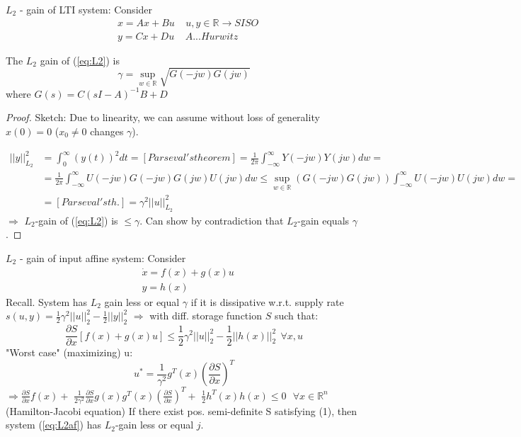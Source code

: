 $L_2$ - gain of LTI system:
 Consider 
 \begin{equation} \label{eq:L2}
\begin{split}
&x=Ax+Bu \ \ \ \ \ u,y\in\mathbb{R}\rightarrow SISO\\
&y=Cx+Du \ \ \ \ \ A ... Hurwitz
\end{split}
\end{equation}
 \begin{Lemma}
The $L_2$ gain of (\ref{eq:L2}) is
$$\gamma=\sup_{w\in\mathbb{R}}\sqrt{G(-jw)G(jw)}$$
 where $G(s)=C(sI-A)^{-1}B+D$
\begin{proof}
 Sketch:
  Due to linearity, we can assume without loss of generality $x(0)=0$ ($x_0 \ne 0$ changes $\gamma$).
  
 \begin{equation*}
  \begin{split}
   ||y||^2_{L_2} &=\int_0^\infty (y(t))^2dt = [Parseval's theorem]=\frac{1}{2\pi}\int_{-\infty}^\infty Y(-jw)Y(jw)dw=\\
                 &=\frac{1}{2\pi}\int_{-\infty}^\infty U(-jw)G(-jw)G(jw)U(jw)dw\le\sup_{w\in\mathbb{R}} (G(-jw)G(jw))\int_{-\infty}^\infty U(-jw)U(jw)dw=\\
                 &=[Parseval's th.] = \gamma^2 ||u||_{L_2}^2
  \end{split}
 \end{equation*}
  $\Rightarrow$ $L_2$-gain of (\ref{eq:L2}) is $\le\gamma$.
  Can show by contradiction that $L_2$-gain equals $\gamma$.
\end{proof}
\end{Lemma}
 $L_2$ - gain of input affine system:
 Consider
 \begin{equation} \label{eq:L2af}
\begin{split}
&\dot x = f(x) +g(x)u\\
&y = h(x)
\end{split}
\end{equation}
 Recall. System has $L_2$ gain less or equal $\gamma$ if it is dissipative w.r.t. supply
rate $s(u,y)=\frac{1}{2}\gamma^2||u||^2_2-\frac{1}{2}||y||_2^2$
 $\Rightarrow$ with diff. storage function $S$ such that:
 $$\frac{\partial S}{\partial x} [f(x)+g(x)u] \le \frac{1}{2}\gamma^2||u||^2_2-\frac{1}{2}||h(x)||_2^2\ \ \forall x,u$$
 "Worst case" (maximizing) u:
 $$u^*=\frac{1}{\gamma^2} g^T(x)\left(\frac{\partial S}{\partial x}\right)^T$$
 $\Rightarrow \frac{\partial S}{\partial x} f(x)+$
$\frac{1}{2\gamma^2}\frac{\partial S}{\partial x}g(x)g^T(x)\left(\frac{\partial S}{\partial x}\right)^T+$
$\frac{1}{2}h^T(x)h(x)\le 0 \ \ \ \forall x\in\mathbb{R}^n$ (Hamilton-Jacobi equation)
 If there exist pos. semi-definite S satisfying (1), then system (\ref{eq:L2af}) has $L_2$-gain
less or equal $j$.